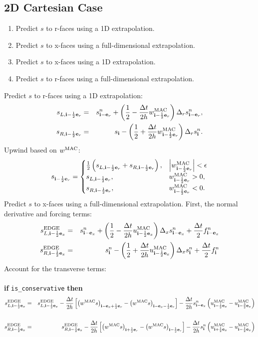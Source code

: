 \newpage

\subsection{2D Cartesian Case}
\begin{enumerate}
\item Predict $s$ to r-faces using a 1D extrapolation.
\item Predict $s$ to x-faces using a full-dimensional extrapolation.
\item Predict $s$ to x-faces using a 1D extrapolation.
\item Predict $s$ to r-faces using a full-dimensional extrapolation.
\end{enumerate}
Predict $s$ to r-faces using a 1D extrapolation:
\begin{eqnarray}
s_{L,{\bf i}-\frac{1}{2}{\bf e}_r} &=& s_{{\bf i}-{\bf e}_r}^n + \left(\frac{1}{2} - \frac{\Delta t}{2h}w_{{\bf i}-\frac{1}{2}{\bf e}_r}^{\rm MAC}\right)\Delta_r s_{{\bf i}-{\bf e}_r}^n, \\
s_{R,{\bf i}-\frac{1}{2}{\bf e}_r} &=& s_{{\bf i}} - \left(\frac{1}{2} + \frac{\Delta t}{2h}w_{{\bf i}-\frac{1}{2}{\bf e}_r}^{\rm MAC}\right)\Delta_r s_{{\bf i}}^n.
\end{eqnarray}
Upwind based on $w^{\rm MAC}$:
\begin{equation}
s_{{\bf i}-\frac{1}{2}{\bf e}_r} =
\begin{cases}
\frac{1}{2}\left(s_{L,{\bf i}-\frac{1}{2}{\bf e}_r} + s_{R,{\bf i}-\frac{1}{2}{\bf e}_r}\right), & \left|w^{\rm MAC}_{{\bf i}-\frac{1}{2}{\bf e}_r}\right| < \epsilon \\
s_{L,{\bf i}-\frac{1}{2}{\bf e}_r}, & w^{\rm MAC}_{{\bf i}-\frac{1}{2}{\bf e}_r} > 0, \\
s_{R,{\bf i}-\frac{1}{2}{\bf e}_r}, & w^{\rm MAC}_{{\bf i}-\frac{1}{2}{\bf e}_r} < 0. \\
\end{cases}
\end{equation}
Predict $s$ to x-faces using a full-dimensional extrapolation.  First, the normal derivative and forcing terms:
\begin{eqnarray}
s_{L,{\bf i}-\frac{1}{2}{\bf e}_x}^{\rm EDGE} &=& s_{{\bf i}-{\bf e}_x}^n + \left(\frac{1}{2} - \frac{\Delta t}{2h}u_{{\bf i}-\frac{1}{2}{\bf e}_x}^{\rm MAC}\right)\Delta_x s_{{\bf i}-{\bf e}_x}^n + \frac{\Delta t}{2}f_{{\bf i}-{\bf e}_x}^n \\
s_{R,{\bf i}-\frac{1}{2}{\bf e}_x}^{\rm EDGE} &=& s_{{\bf i}}^n - \left(\frac{1}{2} + \frac{\Delta t}{2h}u_{{\bf i}-\frac{1}{2}{\bf e}_x}^{\rm MAC}\right)\Delta_x s_{{\bf i}}^n + \frac{\Delta t}{2}f_{{\bf i}}^n 
\end{eqnarray}
Account for the transverse terms:\\ \\
{\bf if} {\tt is\_conservative} {\bf then}
\begin{eqnarray}
s_{L,{\bf i}-\frac{1}{2}{\bf e}_x}^{\rm EDGE} &=& s_{L,{\bf i}-\frac{1}{2}{\bf e}_x}^{\rm EDGE} -
\frac{\Delta t}{2h}\left[\left(w^{\rm MAC}s\right)_{{\bf i}-{\bf e}_x+\frac{1}{2}{\bf e}_r} - \left(w^{\rm MAC}s\right)_{{\bf i}-{\bf e}_x-\frac{1}{2}{\bf e}_r}\right] - \frac{\Delta t}{2h}s_{{\bf i}-{\bf e}_x}^{n}\left(u_{{\bf i}-\frac{1}{2}{\bf e}_x}^{\rm MAC}-u_{{\bf i}-\frac{3}{2}{\bf e}_x}^{\rm MAC}\right)\nonumber \\
&&\\
s_{R,{\bf i}-\frac{1}{2}{\bf e}_x}^{\rm EDGE} &=& s_{R,{\bf i}-\frac{1}{2}{\bf e}_x}^{\rm EDGE} -
\frac{\Delta t}{2h}\left[\left(w^{\rm MAC}s\right)_{{\bf i}+\frac{1}{2}{\bf e}_r} - \left(w^{\rm MAC}s\right)_{{\bf i}-\frac{1}{2}{\bf e}_r}\right] - \frac{\Delta t}{2h}s_{{\bf i}}^{n}\left(u_{{\bf i}+\frac{1}{2}{\bf e}_x}^{\rm MAC}-u_{{\bf i}-\frac{1}{2}{\bf e}_x}^{\rm MAC}\right)
\end{eqnarray}
